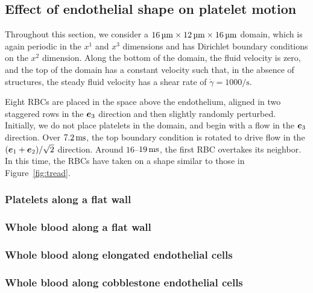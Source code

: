 \subsection{Effect of endothelial shape on platelet motion}\label{sec:whole-blood}

Throughout this section, we consider a $16\um\times12\um\times16\um$ domain, which is
again periodic in the $x^1$ and $x^3$ dimensions and has Dirichlet boundary conditions on
the $x^2$ dimension. Along the bottom of the domain, the fluid velocity is zero, and
the top of the domain has a constant velocity such that, in the absence of structures,
the steady fluid velocity has a shear rate of $\dot{\gamma} = 1000\si{\per\second}$.

Eight RBCs are placed in the space above the endothelium, aligned in two staggered rows
in the $\boldsymbol{e}_3$ direction and then slightly randomly perturbed. Initially, we do not place
platelets in the domain, and begin with a flow in the $\boldsymbol{e}_3$ direction. Over $7.2\ms$,
the top boundary condition is rotated to drive flow in the  $(\boldsymbol{e}_1 + \boldsymbol{e}_2)/\sqrt{2}$
direction. Around $16$--$19\ms$, the first RBC overtakes its neighbor. In this time, the
RBCs have taken on a shape similar to those in Figure~\ref{fig:tread}.

\subsubsection{Platelets along a flat wall}
\subsubsection{Whole blood along a flat wall}
\subsubsection{Whole blood along elongated endothelial cells}
\subsubsection{Whole blood along cobblestone endothelial cells}
